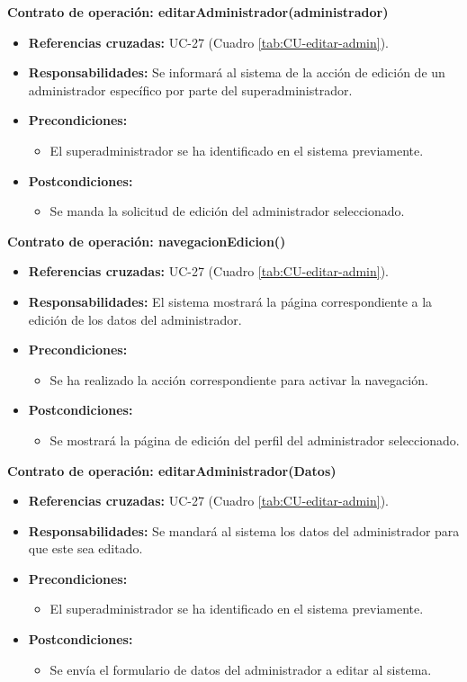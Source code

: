 \textbf{Contrato de operación: editarAdministrador(administrador)}
\begin{itemize}
\item \textbf{Referencias cruzadas:} UC-27 (Cuadro \ref{tab:CU-editar-admin}).
\item \textbf{Responsabilidades:} Se informará al sistema de la acción de edición de un administrador específico por parte del superadministrador.
\item \textbf{Precondiciones:} 
 \begin{itemize}
\item El superadministrador se ha identificado en el sistema previamente.
\end {itemize}
\item \textbf{Postcondiciones:} 
 \begin{itemize}
\item Se manda la solicitud de edición del administrador seleccionado.
\end {itemize}
\end {itemize}

\textbf{Contrato de operación: navegacionEdicion()}
\begin{itemize}
\item \textbf{Referencias cruzadas:} UC-27 (Cuadro \ref{tab:CU-editar-admin}).
\item \textbf{Responsabilidades:} El sistema mostrará la página correspondiente a la edición de los datos del administrador.
\item \textbf{Precondiciones:} 
 \begin{itemize}
\item Se ha realizado la acción correspondiente para activar la navegación.
\end {itemize}
\item \textbf{Postcondiciones:} 
 \begin{itemize}
\item Se mostrará la página de edición del perfil del administrador seleccionado.
\end {itemize}
\end {itemize}

\textbf{Contrato de operación: editarAdministrador(Datos)}
\begin{itemize}
\item \textbf{Referencias cruzadas:} UC-27 (Cuadro \ref{tab:CU-editar-admin}).
\item \textbf{Responsabilidades:} Se mandará al sistema los datos del administrador para que este sea editado.
\item \textbf{Precondiciones:} 
 \begin{itemize}
\item El superadministrador se ha identificado en el sistema previamente.
\end {itemize}
\item \textbf{Postcondiciones:} 
 \begin{itemize}
\item Se envía el formulario de datos del administrador a editar al sistema.
\end {itemize}
\end {itemize}

